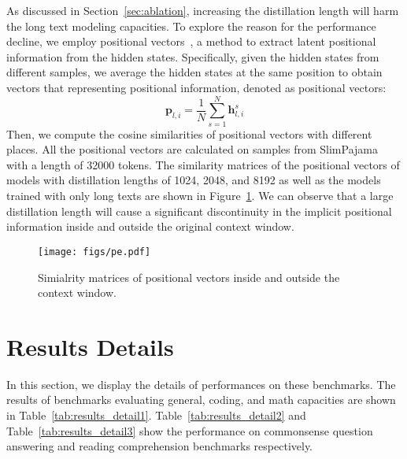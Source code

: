 As discussed in Section~\ref{sec:ablation}, increasing the distillation length will harm the long text modeling capacities. To explore the reason for the performance decline, we employ positional vectors~\cite{dong-arxiv-2024-exploring}, a method to extract latent positional information from the hidden states. Specifically, given the hidden states from different samples, we average the hidden states at the same position to obtain vectors that 
representing positional information, denoted as positional vectors:
\begin{equation}
   \bm  p_{l,i} = \frac 1 N\sum_{s=1}^N \bm h_{l,i}^s 
\end{equation}
Then, we compute the cosine similarities of positional vectors with different places. All the positional vectors are calculated on samples from SlimPajama~\cite{soboleva-huggingface-2023-slimpajama} with a length of 32000 tokens. The similarity matrices of the positional vectors of models with distillation lengths of 1024, 2048, and 8192 as well as the models trained with only long texts are shown in Figure~\ref{fig:pe}. We can observe that a large distillation length will cause a significant discontinuity in the implicit positional information inside and outside the original context window.


\begin{figure}[htb]
    \centering
    \texttt{[image: figs/pe.pdf]}
    \caption{Simialrity matrices of positional vectors inside and outside the context window.}
    \label{fig:pe}
\end{figure}


\section{Results Details}
\label{app:all_results}
In this section, we display the details of performances on these benchmarks. The results of benchmarks evaluating general, coding, and math capacities are shown in Table~\ref{tab:results_detail1}. Table~\ref{tab:results_detail2} and Table~\ref{tab:results_detail3} show the performance on commonsense question answering and reading comprehension benchmarks respectively. 


